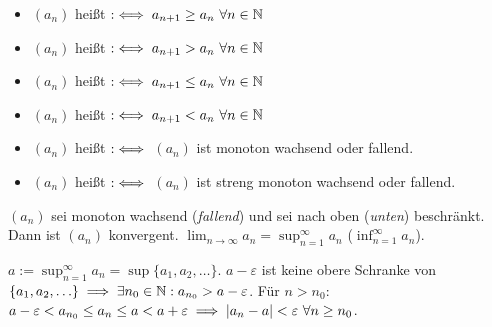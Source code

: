 \documentclass[a4paper,twoside,DIV15,BCOR12mm]{scrbook}
\begin{document}
\begin{definition}[Monotonie]
\begin{itemize}
\item $(a_n)$ heißt  $:\iff a_{n+1} \ge a_n \ \forall n\in\mathbb{N}$
\item $(a_n)$ heißt  $:\iff a_{n+1} > a_n \ \forall n\in\mathbb{N}$
\item $(a_n)$ heißt  $:\iff a_{n+1} \le a_n \ \forall n\in\mathbb{N}$
\item $(a_n)$ heißt  $:\iff a_{n+1} < a_n \ \forall n\in\mathbb{N}$
\item $(a_n)$ heißt  $:\iff$ $(a_n)$ ist monoton wachsend oder fallend.
\item $(a_n)$ heißt  $:\iff$ $(a_n)$ ist streng monoton wachsend oder fallend.
\end{itemize}
\end{definition}

\begin{satz}[Monotoniekriterium]
$(a_n)$ sei monoton wachsend (\textit{fallend}) und sei nach oben (\textit{unten}) beschränkt. Dann ist $(a_n)$ konvergent. $\displaystyle\lim_{n\to\infty}a_n = \mathop{\sup}_{n=1}^\infty a_n$ ($\displaystyle\mathop{\inf}_{n=1}^\infty a_n$).
\end{satz}

\begin{beweis}
$a := \displaystyle\mathop{\sup}_{n=1}^\infty a_n = \sup\{a_1,a_2,\ldots\}$. $a-\varepsilon$ ist keine obere Schranke von $\{a_1, a_2,\ldots\} \implies \exists n_0 \in\mathbb{N}: a_{n_0} > a-\varepsilon$. Für $n>n_0$: $a-\varepsilon < a_{n_0} \le a_n \le a < a + \varepsilon \implies |a_n-a|<\varepsilon \ \forall n \ge n_0$.
\end{beweis}
\end{document}
